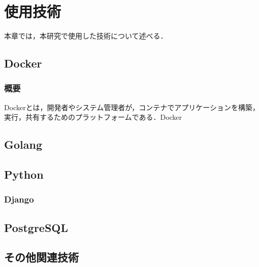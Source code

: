 \section{使用技術}\label{sec2}

本章では，本研究で使用した技術について述べる．

\subsection{Docker}
\subsubsection{概要}

Docker\cite{docker}とは，開発者やシステム管理者が，コンテナでアプリケーションを構築，実行，共有するためのプラットフォームである．Docker
\subsection{Golang}
\subsection{Python}
\subsubsection{Django}
\subsection{PostgreSQL}
\subsection{その他関連技術}